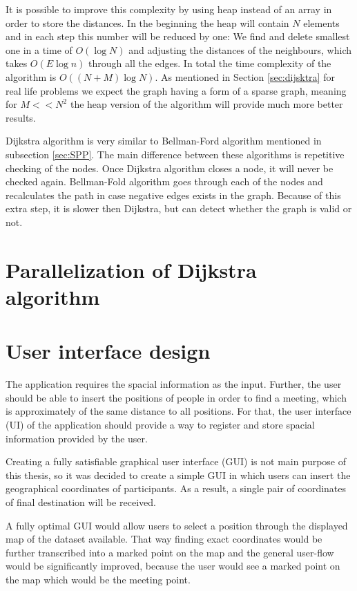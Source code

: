 \documentclass[thesis=M,english]{FITthesis}[2012/10/20]
\begin{document}
It is possible to improve this complexity by using heap instead of an array in order to store the distances. In the beginning the heap will contain $N$ elements and in each step this number will be reduced by one: We find and delete smallest one in a time of $O(\log{N})$ and adjusting the distances of the neighbours, which takes $O(E\log{n})$ through all the edges. In total the time complexity of the algorithm is $O((N+M) \log{N})$. As mentioned in Section \ref{sec:dijsktra} for real life problems we expect the graph having a form of a sparse graph, meaning for $M << N^2$ the heap version of the algorithm will provide much more better results.


Dijkstra algorithm is very similar to Bellman-Ford algorithm mentioned in subsection \ref{sec:SPP}. The main difference between these algorithms is repetitive checking of the nodes. Once Dijkstra algorithm closes a node, it will never be checked again. Bellman-Fold algorithm goes through each of the nodes and recalculates the path in case negative edges exists in the graph. Because of this extra step, it is slower then Dijkstra, but can detect whether the graph is valid or not.

\section{Parallelization of Dijkstra algorithm}

\section{User interface design}
The application requires the spacial information as the input. 
Further, the user should be able to insert the positions of people in order to find a meeting, which is approximately of the same distance to all positions. For that, the user interface (UI) of the application should provide a way to register and store spacial information provided by the user. 

Creating a fully satisfiable graphical user interface (GUI) is not main purpose of this thesis, so it was decided to create a simple GUI in which users can insert the geographical coordinates of participants. As a result, a single pair of coordinates of final destination will be received. 

A fully optimal GUI would allow users to select a position through the displayed map of the dataset available. That way finding exact coordinates would be further transcribed into a marked point on the map and the general user-flow would be significantly improved, because the user would see a marked point on the map which would be the meeting point. 
\end{document}
